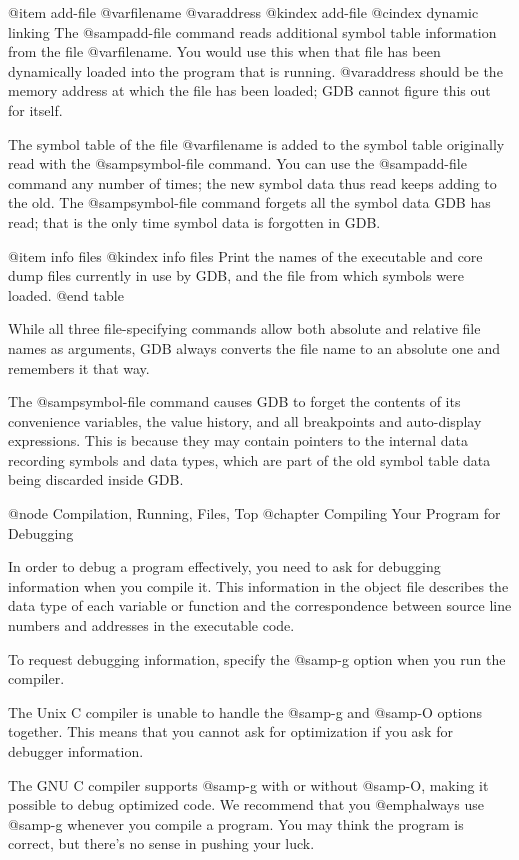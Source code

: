 @item add-file @var{filename} @var{address}
@kindex add-file
@cindex dynamic linking
The @samp{add-file} command reads additional symbol table information
from the file @var{filename}.  You would use this when that file has
been dynamically loaded into the program that is running.  @var{address}
should be the memory address at which the file has been loaded; GDB cannot
figure this out for itself.

The symbol table of the file @var{filename} is added to the symbol table
originally read with the @samp{symbol-file} command.  You can use the
@samp{add-file} command any number of times; the new symbol data thus
read keeps adding to the old.  The @samp{symbol-file} command forgets
all the symbol data GDB has read; that is the only time symbol data is
forgotten in GDB.

@item info files
@kindex info files
Print the names of the executable and core dump files currently in
use by GDB, and the file from which symbols were loaded.
@end table

While all three file-specifying commands allow both absolute and relative
file names as arguments, GDB always converts the file name to an absolute
one and remembers it that way.

The @samp{symbol-file} command causes GDB to forget the contents of its
convenience variables, the value history, and all breakpoints and
auto-display expressions.  This is because they may contain pointers to the
internal data recording symbols and data types, which are part of the old
symbol table data being discarded inside GDB.

@node Compilation, Running, Files, Top
@chapter Compiling Your Program for Debugging

In order to debug a program effectively, you need to ask for debugging
information when you compile it.  This information in the object file
describes the data type of each variable or function and the correspondence
between source line numbers and addresses in the executable code.

To request debugging information, specify the @samp{-g} option when you run
the compiler.

The Unix C compiler is unable to handle the @samp{-g} and @samp{-O} options
together.  This means that you cannot ask for optimization if you ask for
debugger information.

The GNU C compiler supports @samp{-g} with or without @samp{-O}, making it
possible to debug optimized code.  We recommend that you @emph{always} use
@samp{-g} whenever you compile a program.  You may think the program is
correct, but there's no sense in pushing your luck.

